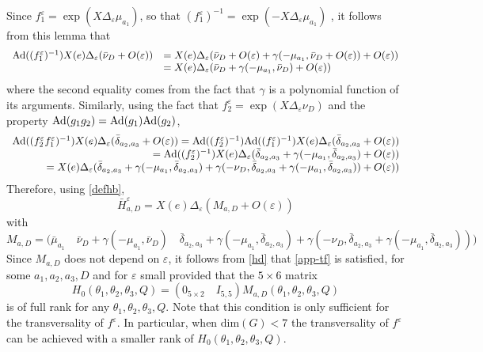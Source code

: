 \documentclass[a4paper,twoside]{article}
\def \Ad {\textnormal{Ad}}
\def \eps {\varepsilon}
\begin{document}
\noindent Since $f_1^\eps= \exp (X \Delta_\eps \mu_{a_1})$, so that $(f_1^\eps)^{-1}= \exp (-X \Delta_\eps \mu_{a_1})$ , 
it follows from this lemma that 
\[
\begin{array}{ll}
\Ad((f_1^\eps)^{-1}) X(e) \Delta_\eps (\bar \nu_{D}+O(\eps)) & = 
X(e) \Delta_\eps (\bar \nu_D+O(\eps)+ \gamma(-\mu_{a_1},\bar \nu_{D}+O(\eps))+O(\eps)) \\
 & = X(e) \Delta_\eps (\bar \nu_D + \gamma(-\mu_{a_1},\bar \nu_{D}) +O(\eps))
\end{array}
\]
where the second equality comes from the fact that $\gamma$ is  a polynomial function of its arguments.
Similarly, using the fact that $f_2^\eps= \exp (X \Delta_\eps \nu_{D})$ and the property $\Ad(g_1 g_2) = \Ad(g_1) \Ad(g_2)$,
\[
\begin{array}{r}
\Ad((f_2^\eps f_1^\eps)^{-1}) X(e)  \Delta_\eps (\bar \delta_{a_2,a_3}+O(\eps)) 
  = \Ad((f_2^\eps)^{-1}) \Ad(( f_1^\eps)^{-1}) X(e)  \Delta_\eps (\bar \delta_{a_2,a_3}+O(\eps)) \\
  = \Ad((f_2^\eps)^{-1}) X(e) \Delta_\eps (\bar \delta_{a_2,a_3} +\gamma(-\mu_{a_1},\bar \delta_{a_2,a_3}) +O(\eps)) \\
  = X(e) \Delta_\eps ( \bar \delta_{a_2,a_3} +\gamma(-\mu_{a_1},\bar \delta_{a_2,a_3}) 
+ \gamma(-\nu_D,\bar \delta_{a_2,a_3} + \gamma(-\mu_{a_1}, \bar \delta_{a_2,a_3})) + O(\eps))
\end{array}
\]
Therefore, using \eqref{defhb},
\begin{equation}
\label{hd}
\bar H_{a,D}^\eps=  X(e) \Delta_\eps (M_{a,D} +O(\eps))
\end{equation}
with
\[
M_{a,D} = \bigl( \bar \mu_{a_1} \quad \bar \nu_{D}+ \gamma(-\mu_{a_1},\bar \nu_{D}) \quad 
\bar \delta_{a_2,a_3} + \gamma(-\mu_{a_1},\bar \delta_{a_2,a_3}) +
\gamma(-\nu_D,\bar \delta_{a_2,a_3} + \gamma(-\mu_{a_1},\bar \delta_{a_2,a_3})) \bigr)
\]
Since $M_{a,D}$ does not depend on $\eps$, it follows from \eqref{hd} that \eqref{app-tf} is satisfied, 
for some $a_1,a_2,a_3,D$ and for $\eps$ small provided that the $5\times 6$ matrix
\[
H_0(\theta_1,\theta_2,\theta_3,Q)= (0_{5 \times 2} \quad I_{5,5} ) M_{a,D} (\theta_1,\theta_2,\theta_3,Q)
\]
is of full rank for any $\theta_1,\theta_2,\theta_3,Q$. Note that this condition is only sufficient for 
the transversality of $f^\eps$. In particular, when $\text{dim}(G) < 7$ the transversality of $f^\eps$ can 
be achieved with a smaller rank of $H_0(\theta_1,\theta_2,\theta_3,Q)$.
\vspace*{.2cm}
\end{document}
